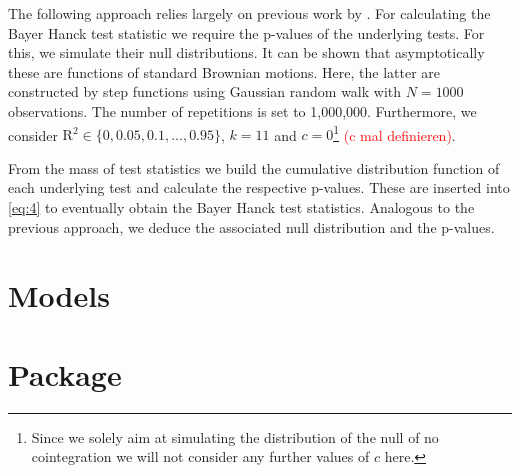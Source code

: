 \documentclass[12pt,a4paper]{article}
\let\rmarkdownfootnote\footnote%
\def\footnote{\protect\rmarkdownfootnote}
\begin{document}
The following approach relies largely on previous work by
\textcite{Pesavento_2004}. For calculating the Bayer Hanck test
statistic we require the p-values of the underlying tests. For this, we
simulate their null distributions. It can be shown that asymptotically
these are functions of standard Brownian motions. Here, the latter are
constructed by step functions using Gaussian random walk with
\(N = 1000\) observations. The number of repetitions is set to
1,000,000. Furthermore, we consider
\(\text{R}^2 \in \{0, 0.05, 0.1, ..., 0.95\}\), \(k = 11\) and
\(c = 0\)\footnote{Since we solely aim at simulating the distribution of
  the null of no cointegration we will not consider any further values
  of \(c\) here.} \textcolor{red}{(c mal definieren)}.

From the mass of test statistics we build the cumulative distribution
function of each underlying test and calculate the respective p-values.
These are inserted into \eqref{eq:4} to eventually obtain the Bayer
Hanck test statistics. Analogous to the previous approach, we deduce the
associated null distribution and the p-values.

\hypertarget{models}{%
\section{Models}\label{models}}

\hypertarget{package}{%
\section{Package}\label{package}}

\pagebreak

\setcounter{page}{3}
\printbibliography[title = References]
\cleardoublepage

\begin{refsection}
\nocite{R-base}
\nocite{R-stargazer}
\nocite{R-stringr}
\nocite{R-tidyr}
\nocite{R-dplyr}
\nocite{R-glmnet}
\nocite{R-class}
\nocite{R-MASS}
\nocite{R-plm}
\nocite{R-leaps}
\nocite{R-caret}
\nocite{R-tree}
\nocite{R-gbm}
\nocite{R-plotmo}
\nocite{R-pls}
\nocite{R-splines}
\nocite{R-tictoc}
\nocite{R-plotly}
\nocite{R-inspectdf}
\nocite{R-rpart}
\nocite{R-rpart.plot}
\nocite{R-stargazer}
\nocite{R-knitr}
\nocite{R-purrr}
\nocite{R-randomForest}
\nocite{R-rstudioapi}





\nocite{R-Studio}

\printbibliography[title = Software-References]
\end{refsection}
\end{document}
